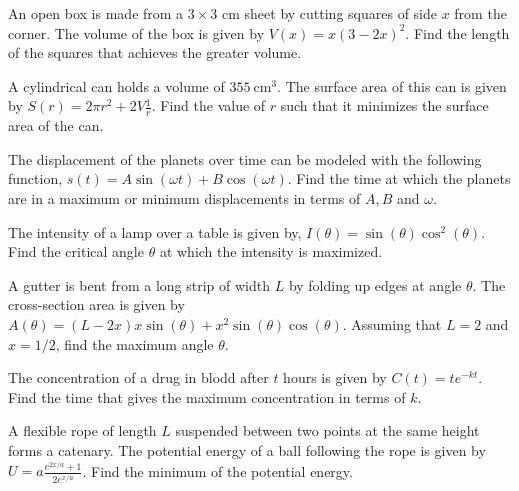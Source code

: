 \documentclass[11pt, a4paper, oneside]{article}
\begin{document}
    An open box is made from a $3\times 3$ cm sheet by cutting squares of side $x$ from the corner.
    The volume of the box is given by 
    \(V(x) = x(3-2x)^2\).
    Find the length of the squares that achieves the greater volume.

    \boxarea[2cm]

    
    A cylindrical can holds a volume of  \(355~\mathrm{cm}^3\).
    The surface area of this can is given by 
    \(S(r) = 2\pi r^2 + 2V\frac{1}{r}\).
    Find the value of $r$ such that it minimizes the surface area of the can.

    \boxarea[2cm]

    
    The displacement of the planets over time can be modeled with the following function,
    \(s(t) = A\sin(\omega t) + B\cos(\omega t) \).
    Find the time at which the planets are in a  maximum or minimum displacements in terms of $A,B$ and $\omega$.

    \boxarea[2cm]

\newpage


    The intensity of a lamp over a table is given by,
    \( I(\theta) = \sin(\theta)\cos^2(\theta) \).
    Find the critical angle $\theta$ at which the intensity is maximized.

    \boxarea[2cm]


    A gutter is bent from a long strip of width $L$ by folding up edges at angle $\theta$.
    The cross-section area is given by \(A(\theta) = (L-2x)x\sin(\theta) + x^2\sin(\theta)\cos(\theta) \).
    Assuming that $L=2$ and $x=1/2$, find the maximum angle $\theta$.

    \boxarea[2cm]


    The concentration of a drug in blodd after $t$ hours is given by \(C(t) = te^{-kt}\).
    Find the time that gives the maximum concentration in terms of $k$.

    \boxarea[2cm]

\newpage


    A flexible rope of length $L$ suspended between two points at the same height forms a catenary.
    The potential energy of a ball following the rope is given by \(U=a \frac{e^{2x/a}+1}{2e^{x/a}}\).
    Find the minimum of the potential energy.
\end{document}
